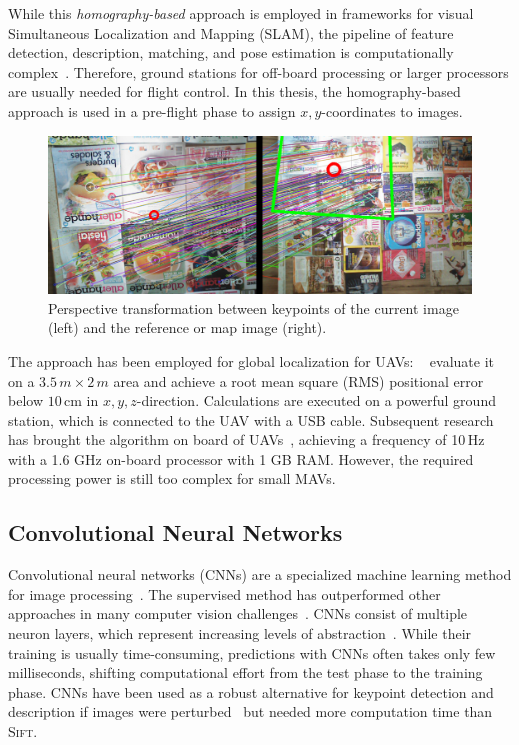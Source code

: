\documentclass[11pt]{report}
\begin{document}
While this \emph{homography-based} approach is employed in frameworks
for visual Simultaneous Localization and Mapping (SLAM), the pipeline
of feature detection, description, matching, and pose estimation is
computationally complex~\cite{kendall2015posenet}. Therefore, ground
stations for off-board processing or larger processors are usually
needed for flight control. In this thesis, the homography-based
approach is used in a pre-flight phase to assign $x,y$-coordinates to
images.
\begin{figure}[h]
\begin{center}
\includegraphics[width=0.85\columnwidth]{sift}
\caption{{\label{fig:sift}Perspective transformation between keypoints of the current
    image (left) and the reference or map image (right).%
  }}
\end{center}
\end{figure}
The approach has been employed for global localization for UAVs:
\citeauthor{blosch2010vision}~\cite{blosch2010vision} evaluate it on a
$3.5\,m \times 2\,m$ area and achieve a root mean square (RMS)
positional error below $10$\,cm in $x,y,z$-direction. Calculations are
executed on a powerful ground station, which is connected to the UAV
with a USB cable. Subsequent research has brought the algorithm on
board of UAVs~\cite{achtelik2011onboard}, achieving a frequency of
10\,Hz with a 1.6 GHz on-board processor with 1 GB RAM. However, the
required processing power is still too complex for small
MAVs. %

\subsection{Convolutional Neural Networks}

Convolutional neural networks (CNNs) are a specialized machine
learning method for image processing~\cite{lecun1998gradient}. The
supervised method has outperformed other approaches in many computer
vision challenges~\cite{dosovitskiy2014discriminative}. CNNs consist
of multiple neuron layers, which represent increasing levels of
abstraction~\cite{lecun1998gradient}. While their training is usually
time-consuming, predictions with CNNs often takes only few
milliseconds, shifting computational effort from the test phase to the
training phase. CNNs have been used as a robust alternative for
keypoint detection and description if images were
perturbed~\cite{dosovitskiy2014discriminative} but needed more
computation time than \textsc{Sift}.
\end{document}

